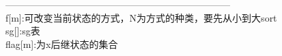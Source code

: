 ﻿-----------------------------------------------------------------------\\
f[m]:可改变当前状态的方式，N为方式的种类，要先从小到大sort\\
sg[]:sg表\\
flag[m]:为x后继状态的集合

